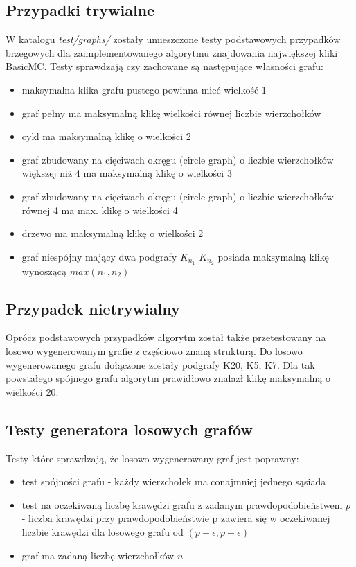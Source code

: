 \documentclass[12pt, a4paper]{article}
\begin{document}
\subsection{Przypadki trywialne}
W katalogu \textit{test/graphs/} zostały umieszczone testy podstawowych przypadków brzegowych dla zaimplementowanego algorytmu znajdowania największej kliki BasicMC.
Testy sprawdzają czy zachowane są następujące własności grafu:
\begin{itemize}
  \item maksymalna klika grafu pustego powinna mieć wielkość 1
  \item graf pełny ma maksymalną klikę wielkości równej liczbie wierzchołków
  \item cykl ma maksymalną klikę o wielkości 2
  \item graf zbudowany na cięciwach okręgu (circle graph) o liczbie wierzchołków większej niż 4 ma maksymalną klikę o wielkości 3
  \item graf zbudowany na cięciwach okręgu (circle graph) o liczbie wierzchołków równej 4 ma max. klikę o wielkości 4
  \item drzewo ma maksymalną klikę o wielkości 2
  \item graf niespójny mający dwa podgrafy $K_{n_{1}}$ $K_{n_{2}}$ posiada maksymalną klikę wynoszącą $max(n_{1}, n_{2})$
\end{itemize}

\subsection{Przypadek nietrywialny}
Oprócz podstawowych przypadków algorytm został także przetestowany na losowo wygenerowanym grafie z częściowo znaną strukturą. Do losowo wygenerowanego grafu dołączone zostały podgrafy K20, K5, K7. Dla tak powstałego spójnego grafu algorytm prawidłowo znalazł klikę maksymalną o wielkości 20.

\subsection{Testy generatora losowych grafów}
Testy które sprawdzają, że losowo wygenerowany graf jest poprawny:
\begin{itemize}
  \item test spójności grafu - każdy wierzchołek ma conajmniej jednego sąsiada
  \item test na oczekiwaną liczbę krawędzi grafu z zadanym prawdopodobieństwem $p$ - liczba krawędzi przy prawdopodobieństwie p zawiera się w oczekiwanej liczbie krawędzi dla losowego grafu od $(p - \epsilon, p + \epsilon)$
  \item graf ma zadaną liczbę wierzchołków $n$
\end{itemize}
\end{document}
